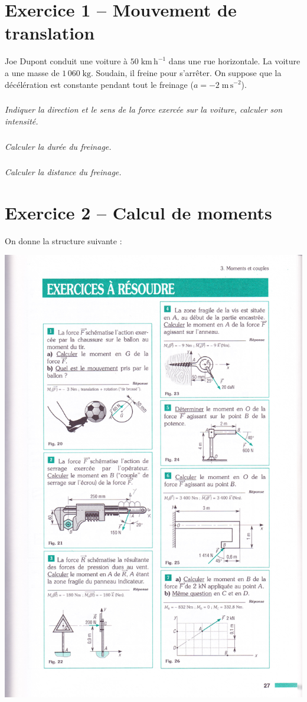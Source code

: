 \documentclass[10pt,fleqn]{book} %
\begin{document}

\vspace{7cm}
\pagestyle{fancy}
\thispagestyle{plain}


\def\columnseprulecolor{\color{ocre}}
\setlength{\columnseprule}{0.4pt} 
\begin{multicols}{2}

\section*{Exercice 1 -- Mouvement de translation}

Joe Dupont conduit une voiture à $50\; \text{km}\,\text{h}^{-1}$ dans une rue horizontale. La voiture a une masse de $1\,060\; \text{kg}$. Soudain, il freine pour s’arrêter.  On suppose que la décélération est constante pendant tout le freinage ($a = -2\; \text{m}\,\text{s}^{-2}$).

\subparagraph{}
\textit{Indiquer la direction et le sens de la force exercée sur la voiture, calculer son intensité.}

\subparagraph{}
\textit{Calculer la durée du freinage.}

\subparagraph{}
\textit{Calculer la distance du freinage.}


\section*{Exercice 2 -- Calcul de moments}

\setcounter{subparagraph}{0}
On donne la structure suivante : 
\begin{center}
\includegraphics[width=.6\linewidth]{images/moment8}
\end{center}


\end{multicols}
\end{document}
